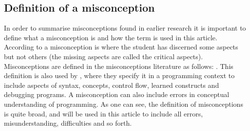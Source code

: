 
\subsection<article>{Definition of a misconception}

In order to summarise misconceptions found in earlier research it is 
important to define what a misconception is and how the term is used in this 
article. According to \textcite{NCOL} a misconception is where the student has 
discerned some aspects but not others (the missing aspects are called the 
critical aspects).
Misconceptions are defined in the misconceptions literature as follows: 
. This definition is also used by 
\textcite{MisconceptionsSurvey2017}, where they specify it in a programming 
context to include aspects of syntax, concepts, control flow, learned 
constructs and debugging programs. A misconception can also include errors in 
conceptual understanding of programming. As one can see, the definition of 
misconceptions is quite broad, and will be used in this article to include all 
errors, misunderstanding, difficulties and so forth.

